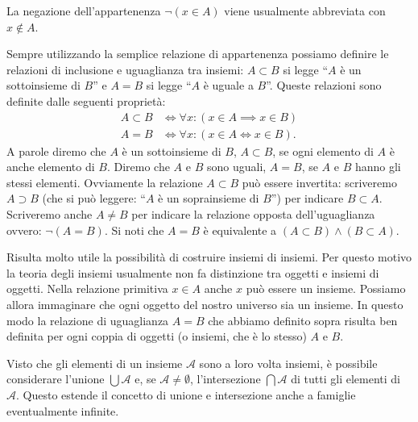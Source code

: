 La negazione dell'appartenenza $\lnot (x \in A)$ viene usualmente
abbreviata con $x \not \in A$.

Sempre utilizzando la semplice relazione di appartenenza possiamo definire
le relazioni di inclusione e uguaglianza tra insiemi:
$A \subset B$ si legge ``$A$ è un sottoinsieme di $B$''
e $A=B$ si legge ``$A$ è uguale a $B$''. Queste relazioni sono
definite dalle seguenti proprietà:
\begin{align*}
  A \subset B &\iff \forall x\colon (x\in A \implies x\in B)\\
  A = B &\iff \forall x\colon (x\in A \iff x \in B).
\end{align*}
A parole diremo che $A$ è un sottoinsieme di $B$, 
$A \subset B$, se ogni elemento di $A$ è anche elemento di $B$.
Diremo che $A$ e $B$ sono uguali, $A=B$, 
se $A$ e $B$ hanno gli stessi elementi.
Ovviamente la relazione $A \subset B$ può essere invertita: scriveremo
$A\supset B$ (che si può leggere: ``$A$ è un soprainsieme di $B$'')
per indicare $B \subset A$. Scriveremo anche $A \neq B$ per indicare
la relazione opposta dell'uguaglianza ovvero: $\lnot(A=B)$.
Si noti che $A=B$ è equivalente a $(A\subset B) \land (B\subset A)$.

Risulta molto utile la possibilità di costruire insiemi di insiemi.
Per questo motivo la teoria degli insiemi usualmente non fa distinzione
tra oggetti e insiemi di oggetti. Nella relazione primitiva $x\in A$ anche
$x$ può essere un insieme. Possiamo allora immaginare che ogni oggetto del
nostro universo sia un insieme. In questo modo la relazione di uguaglianza $A=B$
che abbiamo definito sopra risulta ben definita per ogni coppia di oggetti
(o insiemi, che è lo stesso) $A$ e $B$.

Visto che gli elementi di un insieme $\mathcal A$ sono a loro volta insiemi,
è possibile considerare l'unione $\bigcup \mathcal A$
e, se
$\mathcal A \neq \emptyset$, l'intersezione $\bigcap \mathcal A$ di tutti gli elementi
di $\mathcal A$.
Questo estende il concetto di unione e intersezione anche a famiglie
eventualmente infinite.

